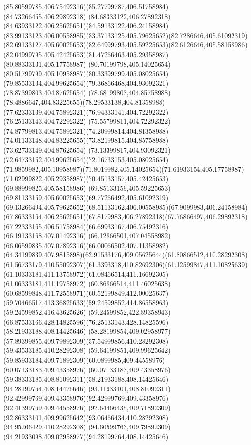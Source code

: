 {{\curveto(85.80599785,406.75492316)(85.27799787,406.51758984)(84.73266455,406.29892318)
\curveto(84.68333122,406.27892318)(84.63933122,406.25625651)(84.59133122,406.24158984)
\curveto(83.99133123,406.00558985)(83.37133125,405.79625652)(82.7286646,405.61092319)
\curveto(82.69133127,405.60025653)(82.64999793,405.59225653)(82.6126646,405.58158986)
\curveto(82.04999795,405.42425653)(81.47266463,405.29358987)(80.88333131,405.17758987)
\curveto(80.70199798,405.14025654)(80.51799799,405.10958987)(80.33399799,405.08025654)
\curveto(79.85533134,404.99625654)(79.36866468,404.93092321)(78.87399803,404.87625654)
\curveto(78.68199803,404.85758988)(78.4886647,404.83225655)(78.29533138,404.81358988)
\curveto(77.62333139,404.75892321)(76.94333141,404.72292322)(76.25133143,404.72292322)
\curveto(75.55799811,404.72292322)(74.87799813,404.75892321)(74.20999814,404.81358988)
\curveto(74.01133148,404.83225655)(73.82199815,404.85758988)(73.62733149,404.87625654)
\curveto(73.13399817,404.93092321)(72.64733152,404.99625654)(72.16733153,405.08025654)
\curveto(71.9859982,405.10958987)(71.8019982,405.14025654)(71.61933154,405.17758987)
\curveto(71.02999822,405.29358987)(70.45133157,405.42425653)(69.88999825,405.58158986)
\curveto(69.85133159,405.59225653)(69.81133159,405.60025653)(69.77266492,405.61092319)
\curveto(69.13266494,405.79625652)(68.51133162,406.00558985)(67.9099983,406.24158984)
\curveto(67.86333164,406.25625651)(67.8179983,406.27892318)(67.76866497,406.29892318)
\curveto(67.22333165,406.51758984)(66.69933167,406.75492316)(66.19133168,407.01492316)
\curveto(66.12866501,407.04558982)(66.06599835,407.07892316)(66.00066502,407.11358982)
\curveto(64.34199839,407.9815898)(62.91533176,409.05625644)(61.80866512,410.28292308)
\curveto(61.56733179,410.55092307)(61.3393318,410.82692306)(61.12599847,411.10825639)
\curveto(61.10333181,411.13758972)(61.08466514,411.16692305)(61.06333181,411.19758972)
\curveto(60.86866514,411.46025638)(60.68599848,411.72558971)(60.52199849,412.00025637)
\curveto(59.70466517,413.36825633)(59.24599852,414.86558963)(59.24599852,416.43625626)
\curveto(59.24599852,422.89358943)(66.87533166,428.14825596)(76.25133143,428.14825596)
\moveto(58.21933188,408.14425646)
\curveto(58.28199854,409.02958977)(57.89399855,409.79892309)(57.54999856,410.28292308)
\lineto(59.43533185,410.28292308)
\curveto(59.64199851,409.99625642)(59.85933184,409.71892309)(60.0899985,409.44558976)
\lineto(60.07133183,409.43358976)
\curveto(60.07133183,409.43358976)(59.38333185,408.81092311)(58.21933188,408.14425646)
\moveto(94.28199764,408.14425646)
\curveto(93.11933101,408.81092311)(92.42999769,409.43358976)(92.42999769,409.43358976)
\lineto(92.41399769,409.44558976)
\curveto(92.64466435,409.71892309)(92.86333101,409.99625642)(93.06466434,410.28292308)
\lineto(94.95266429,410.28292308)
\curveto(94.60599763,409.79892309)(94.21933098,409.02958977)(94.28199764,408.14425646)
}
}

